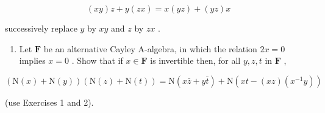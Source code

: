 \[
(x y) z + y (z x) = x (y z) + (y z) x
\]

successively replace \(y\) by \(xy\) and \(z\) by \(zx\) .

\begin{enumerate}
\def\labelenumi{\arabic{enumi}.}
\setcounter{enumi}{2}
\tightlist
\item
  Let \(\mathbf{F}\) be an alternative Cayley A-algebra, in which the relation \(2x = 0\) implies \(x = 0\) . Show that if \(x \in \mathbf{F}\) is invertible then, for all \(y, z, t\) in \(\mathbf{F}\) ,
\end{enumerate}

\[
(\mathrm{N} (x) + \mathrm{N} (y)) (\mathrm{N} (z) + \mathrm{N} (t)) = \mathrm{N} (x \bar {z} + y \bar {t}) + \mathrm{N} (x t - (x z) (x ^ {- 1} y))
\]

(use Exercises 1 and 2).
